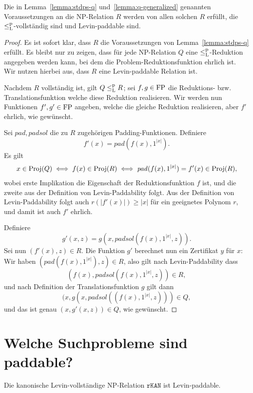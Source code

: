 \begin{lemma}
    Die in Lemma~\ref{lemma:stdps-q} und~\ref{lemma:q-generalized} genannten Voraussetzungen an die NP-Relation $R$ werden von allen solchen $R$ erfüllt, die $\leq_\mathrm{L}^\mathrm{p}$-vollständig sind und Levin-paddable sind.
\end{lemma}
\begin{proof}
    Es ist sofort klar, dass $R$ die Voraussetzungen von Lemma~\ref{lemma:stdps-q} erfüllt.
    Es bleibt nur zu zeigen, dass für jede NP-Relation $Q$ eine $\leq_\mathrm{L}^\mathrm{p}$-Reduktion angegeben werden kann, bei dem die Problem-Reduktionsfunktion ehrlich ist.
    Wir nutzen hierbei aus, dass $R$ eine Levin-paddable Relation ist.

    Nachdem $R$ vollständig ist, gilt $Q\leq_\mathrm{L}^\mathrm{p} R$; sei $f,g\in\mathrm{FP}$ die Reduktions- bzw. Translationsfunktion welche diese Reduktion realisieren. Wir werden nun Funktionen $f', g'\in\mathrm{FP}$ angeben, welche die gleiche Reduktion realisieren, aber $f'$ ehrlich, wie gewünscht.

    Sei $\mathit{pad}, \mathit{padsol}$ die zu $R$ zugehörigen Padding-Funktionen. Definiere
    \[ f'(x) = \mathit{pad}(f(x), 1^{|x|}). \]
    Es gilt
    \[ x\in\operatorname{Proj}(Q) \iff f(x)\in \operatorname{Proj}(R) \iff \mathit{pad}(f(x), 1^{|x|})=f'(x)\in\operatorname{Proj}(R), \]
    wobei erste Implikation die Eigenschaft der Reduktionsfunktion $f$ ist, und die zweite aus der Definition von Levin-Paddability folgt.
    Aus der Definition von  Levin-Paddability folgt auch $r(|f'(x)|)\geq |x|$ für ein geeignetes Polynom $r$, und damit ist auch $f'$ ehrlich.

    Definiere
    \[ g'(x, z) = g(x, \mathit{padsol}(f(x), 1^{|x|}, z)). \]
    Sei nun $(f'(x), z)\in R$. Die Funktion $g'$ berechnet nun ein Zertifikat $y$ für $x$: Wir haben $(\mathit{pad}(f(x), 1^{|x|}), z)\in R$, also gilt nach Levin-Paddability dass \[(f(x), \mathit{padsol}(f(x), 1^{|x|}, z))\in R,\] 
    und nach Definition der Translationsfunktion $g$ gilt dann
    \[(x, g(x, \mathit{padsol}((f(x), 1^{|x|}, z)))\in Q,\]
    und das ist genau $(x, g'(x, z))\in Q$, wie gewünscht.
\end{proof}

\section{Welche Suchprobleme sind paddable?}

\begin{observation}\label{obs:rkan-paddable}
    Die kanonische Levin-vollständige NP-Relation $\mathtt{rKAN}$ ist Levin-paddable.
\end{observation}

